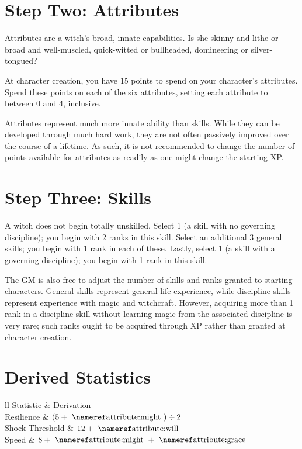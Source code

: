 \section{Step Two: Attributes}

Attributes are a witch's broad, innate capabilities.
Is she skinny and lithe or broad and well-muscled, quick-witted or bullheaded, domineering or silver-tongued?

At character creation, you have 15 points to spend on your character's attributes.
Spend these points on each of the six attributes, setting each attribute to between 0 and 4, inclusive.

Attributes represent much more innate ability than skills.
While they can be developed through much hard work, they are not often passively improved over the course of a lifetime.
As such, it is not recommended to change the number of points available for attributes as readily as one might change the starting XP.

\section{Step Three: Skills}

A witch does not begin totally unskilled.
Select 1  (a skill with no governing discipline); you begin with 2 ranks in this skill.
Select an additional 3 general skills; you begin with 1 rank in each of these.
Lastly, select 1  (a skill with a governing discipline); you begin with 1 rank in this skill.

The GM is also free to adjust the number of skills and ranks granted to starting characters.
General skills represent general life experience, while discipline skills represent experience with magic and witchcraft.
However, acquiring more than 1 rank in a discipline skill without learning magic from the associated discipline is very rare; such ranks ought to be acquired through XP rather than granted at character creation.

\section{Derived Statistics}

\begin{simpletable}{ll}
	\toprule
	Statistic & Derivation\\
	\midrule
	Resilience & $(5 + \text{\attref{might}}) \div 2$\\
	Shock Threshold & $12 + \text{\attref{will}}$\\
	Speed & $8 + \text{\attref{might}} + \text{\attref{grace}}$\\
	\bottomrule
\end{simpletable}

